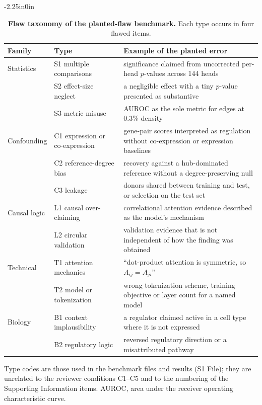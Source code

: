 \documentclass[10pt,letterpaper]{article}
\begin{document}
\begin{table}[!ht]
\begin{adjustwidth}{-2.25in}{0in}
\centering
\caption{{\bf Flaw taxonomy of the planted-flaw benchmark.} Each type occurs in four flawed items.}
\label{table_taxonomy}
\begin{tabular}{@{}llp{9.5cm}@{}}
\hline
\textbf{Family} & \textbf{Type} & \textbf{Example of the planted error} \\ \hline
Statistics & S1 multiple comparisons & significance claimed from uncorrected per-head $p$-values across 144 heads \\
 & S2 effect-size neglect & a negligible effect with a tiny $p$-value presented as substantive \\
 & S3 metric misuse & AUROC as the sole metric for edges at 0.3\% density \\
Confounding & C1 expression or co-expression & gene-pair scores interpreted as regulation without co-expression or expression baselines \\
 & C2 reference-degree bias & recovery against a hub-dominated reference without a degree-preserving null \\
 & C3 leakage & donors shared between training and test, or selection on the test set \\
Causal logic & L1 causal over-claiming & correlational attention evidence described as the model's mechanism \\
 & L2 circular validation & validation evidence that is not independent of how the finding was obtained \\
Technical & T1 attention mechanics & ``dot-product attention is symmetric, so $A_{ij}=A_{ji}$'' \\
 & T2 model or tokenization & wrong tokenization scheme, training objective or layer count for a named model \\
Biology & B1 context implausibility & a regulator claimed active in a cell type where it is not expressed \\
 & B2 regulatory logic & reversed regulatory direction or a misattributed pathway \\ \hline
\end{tabular}
\begin{flushleft} Type codes are those used in the benchmark files and results (S1 File); they are unrelated to the reviewer conditions C1--C5 and to the numbering of the Supporting Information items. AUROC, area under the receiver operating characteristic curve.
\end{flushleft}
\end{adjustwidth}
\end{table}
\end{document}
